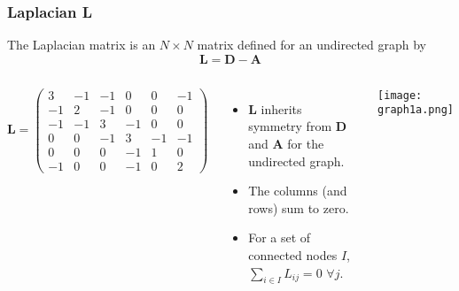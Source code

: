 \documentclass[10pt,aspectratio=169,dvipsnames]{beamer}
\let\olditem\item
\renewcommand{\item}{%
\olditem\vspace{5pt}}
\begin{document}
\begin{frame}
  \frametitle{Laplacian L}
  The \alert{Laplacian matrix} is an $N \times N$ matrix defined for an undirected graph by
\begin{equation*}
\mathbf{L} = \mathbf{D} - \mathbf{A}
\end{equation*}
\vspace{-0.3cm}
\begin{columns}
\begin{equation*}
\mathbf{L}=\left(\begin{matrix}
3 & -1 & -1 & 0 & 0 & -1\\
-1 & 2 & -1 & 0 & 0 & 0\\
-1 & -1 & 3 & -1 & 0 & 0\\
0 & 0 & -1 & 3 & -1 & -1\\
0 & 0 & 0 & -1 & 1 & 0\\
-1 & 0 & 0 & -1 & 0 & 2
\end{matrix}\right)
\end{equation*}
\vspace{-0.3cm}
\begin{itemize}
\item $\mathbf{L}$ inherits symmetry from $\mathbf{D}$ and $\mathbf{A}$ for the undirected graph.
\item The columns (and rows) sum to zero.
\item For a set of connected nodes $I$, $\sum_{i\in I} L_{ij} = 0$  $\forall j$.
\end{itemize}
\texttt{[image: graph1a.png]}
  \end{columns}
\end{frame}
\end{document}
